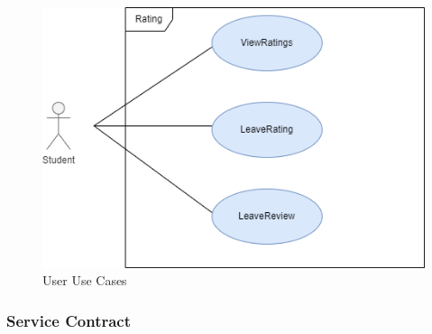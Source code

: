 \documentclass[hidelinks, 12pt, a4paper]{article}
\begin{document}
                    \begin{figure}[H]
                    
                        \centering
                        \includegraphics[]{images/Rating Usecase.drawio.png}
                        \caption{User Use Cases}
                        \label{fig:User UseCases}
                        
                    \end{figure}
         \newpage           
                \subsubsection{Service Contract}
            
\end{document}
